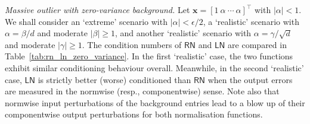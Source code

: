 \documentclass[namedate,webpdf,imanum]{ima-authoring-template}
\newcommand{\Matrix}[1]{\mathbf{#1}}
\newcommand{\trans}{\intercal}
\newcommand{\Layer}[1]{\mathsf{#1}}
\numberwithin{equation}{section}
\begin{document}
\emph{Massive outlier with zero-variance background.}
Let $\Matrix{x} = [1~\alpha~\cdots~\alpha]^\trans$ with $|\alpha| < 1$.
We shall consider an `extreme' scenario with $|\alpha| < \epsilon/2$, a `realistic' scenario with $\alpha = \beta / d$ and moderate $|\beta| \geq 1$, and another `realistic' scenario with $\alpha = \gamma / \sqrt{d}$ and moderate $|\gamma| \geq 1$.
The condition numbers of $\Layer{RN}$ and $\Layer{LN}$ are compared in Table~\ref{tab:rn_ln_zero_variance}.
In the first `realistic' case, the two functions exhibit similar conditioning behaviour overall.
Meanwhile, in the second `realistic' case, $\Layer{LN}$ is strictly better (worse) conditioned than $\Layer{RN}$ when the output errors are measured in the normwise (resp., componentwise) sense.
Note also that normwise input perturbations of the background entries lead to a blow up of their componentwise output perturbations for both normalisation functions.
\end{document}
